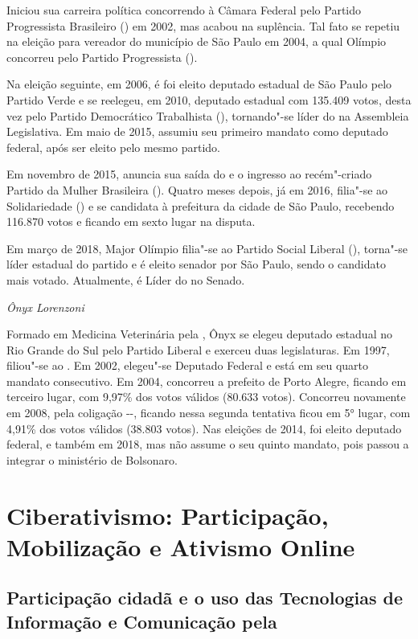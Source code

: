 Iniciou sua carreira política concorrendo à Câmara Federal pelo Partido
Progressista Brasileiro () em 2002, mas acabou na suplência. Tal fato
se repetiu na eleição para vereador do município de São Paulo em 2004, a
qual Olímpio concorreu pelo Partido Progressista ().

Na eleição seguinte, em 2006, é foi eleito deputado estadual de São
Paulo pelo Partido Verde e se reelegeu, em 2010, deputado estadual com
135.409 votos, desta vez pelo Partido Democrático Trabalhista (),
tornando"-se líder do  na Assembleia Legislativa. Em maio de 2015,
assumiu seu primeiro mandato como deputado federal, após ser eleito pelo
mesmo partido.

Em novembro de 2015, anuncia sua saída do  e o ingresso ao
recém"-criado Partido da Mulher Brasileira (). Quatro meses depois, já
em 2016, filia"-se ao Solidariedade () e se candidata à prefeitura da
cidade de São Paulo, recebendo 116.870 votos e ficando em sexto lugar na
disputa.

Em março de 2018, Major Olímpio filia"-se ao Partido Social Liberal
(), torna"-se líder estadual do partido e é eleito senador por São
Paulo, sendo o candidato mais votado. Atualmente, é Líder do  no
Senado.

\emph{Ônyx Lorenzoni}

Formado em Medicina Veterinária pela , Ônyx se elegeu deputado
estadual no Rio Grande do Sul pelo Partido Liberal e exerceu duas
legislaturas. Em 1997, filiou"-se ao . Em 2002, elegeu"-se Deputado
Federal e está em seu quarto mandato consecutivo. Em 2004, concorreu a
prefeito de Porto Alegre, ficando em terceiro lugar, com 9,97\% dos
votos válidos (80.633 votos). Concorreu novamente em 2008, pela
coligação --, ficando nessa segunda tentativa ficou em 5° lugar,
com 4,91\% dos votos válidos (38.803 votos). Nas eleições de 2014, foi
eleito deputado federal, e também em 2018, mas não assume o seu quinto
mandato, pois passou a integrar o ministério de Bolsonaro.

\part{Ciberativismo: Participação, Mobilização e Ativismo Online}

\chapter*{Participação cidadã e o uso das Tecnologias de Informação e Comunicação pela }

